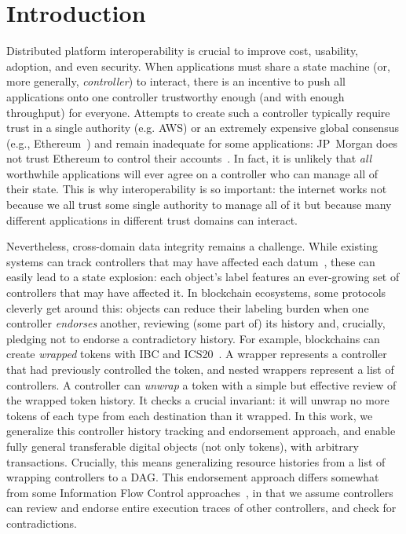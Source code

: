 \documentclass[a4paper,USenglish,cleveref, autoref, thm-restate, anonymous]{lipics-v2021}
\begin{document}
\section{Introduction}
Distributed platform interoperability is crucial to improve cost, usability, adoption, and even security. 
When applications must share a state machine (or, more generally, \emph{controller}) to interact, there is an incentive to push all applications onto one controller trustworthy enough (and with enough throughput) for everyone. 
Attempts to create such a controller typically require trust in a single authority (e.g. AWS\cite{appsync}) or an extremely expensive global consensus (e.g., Ethereum~\cite{ethereum}) and remain inadequate for some applications:
 JP~Morgan does not trust Ethereum to control their accounts~\cite{onyx}.
In fact, it is unlikely that \emph{all} worthwhile applications will ever agree on a controller who can manage all of their state.
This is why interoperability is so important: the internet works not because we all trust some single authority to manage all of it but because many different applications in different trust domains can interact. 

Nevertheless, cross-domain data integrity remains a challenge.
While  existing systems can track controllers that may have affected each datum~\cite{dista,fabric}, these can easily lead to a state explosion: each object's label features an ever-growing set of controllers that may have affected it. 
In blockchain ecosystems, some protocols cleverly get around this: objects can reduce their labeling burden when one controller \emph{endorses} another, reviewing (some part of) its history and, crucially, pledging not to endorse a contradictory history.
For example, blockchains can create \emph{wrapped} tokens with IBC and ICS20~\cite{wrapped,ibc,ics20}. 
A wrapper represents a controller that had previously controlled the token, and nested wrappers represent a list of controllers. 
A controller can \emph{unwrap} a token with a simple but effective review of the wrapped token history. 
It checks a crucial invariant: it will unwrap no more tokens of each type from each destination than it wrapped. 
In this work, we generalize this controller history tracking and endorsement approach, and enable fully general transferable digital objects (not only tokens), with arbitrary transactions. 
Crucially, this means generalizing resource histories from a list of wrapping controllers to a DAG.
This endorsement approach differs somewhat from some Information Flow Control approaches~\cite{fabric, Cecchetti2017}, in that we assume controllers can review and endorse entire execution traces of other controllers, and check for contradictions.
\end{document}
